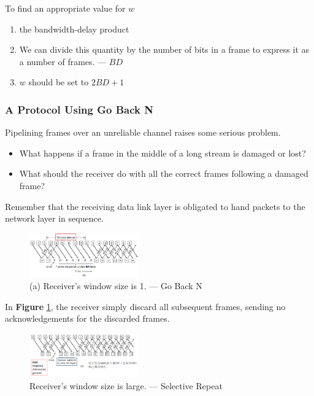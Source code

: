 To find an appropriate value for $w$
\begin{enumerate}%
    \item the bandwidth-delay product
    \item We can divide this quantity by the number of bits in a frame to express it as a number of frames. --- $BD$
    \item $w$ should be set to $2BD+1$
\end{enumerate}

\subsubsection{A Protocol Using Go Back N}
Pipelining frames over an unreliable channel raises some serious problem.
\begin{itemize}
    \item What happens if a frame in the middle of a long stream is damaged or lost?
    \item What should the receiver do with all the correct frames following a damaged frame?
\end{itemize}
Remember that the receiving data link layer is obligated to hand packets to the network layer in sequence.

\begin{figure}[!htb]
    \centering
    \includegraphics[width=0.42\textwidth]{pic/CN3/Receiver's window size is 1.}
    \caption{(a) Receiver's window size is 1. --- Go Back N}
    \label{fig:Go Back N}
\end{figure}
In \textbf{Figure} \ref{fig:Go Back N}, the receiver simply discard all subsequent frames, sending no acknowledgements for the discarded frames.

\begin{figure}[!htb]
    \centering
    \includegraphics[width=0.42\textwidth]{pic/CN3/Receiver's window size is large.}
    \caption{Receiver's window size is large. --- Selective Repeat}
    \label{fig:Selective Repeat}
\end{figure}

